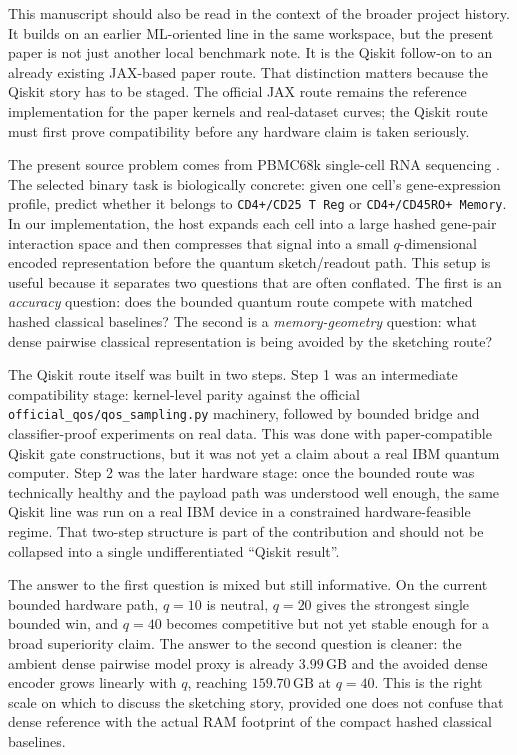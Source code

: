 \documentclass[11pt]{article}
\begin{document}
This manuscript should also be read in the context of the broader project history. It builds on an earlier ML-oriented line in the same workspace, but the present paper is not just another local benchmark note. It is the Qiskit follow-on to an already existing JAX-based paper route. That distinction matters because the Qiskit story has to be staged. The official JAX route remains the reference implementation for the paper kernels and real-dataset curves; the Qiskit route must first prove compatibility before any hardware claim is taken seriously.

The present source problem comes from PBMC68k single-cell RNA sequencing \cite{zheng2017massively,stuart2019singlecell}. The selected binary task is biologically concrete: given one cell's gene-expression profile, predict whether it belongs to \texttt{CD4+/CD25 T Reg} or \texttt{CD4+/CD45RO+ Memory}. In our implementation, the host expands each cell into a large hashed gene-pair interaction space and then compresses that signal into a small $q$-dimensional encoded representation before the quantum sketch/readout path. This setup is useful because it separates two questions that are often conflated. The first is an \emph{accuracy} question: does the bounded quantum route compete with matched hashed classical baselines? The second is a \emph{memory-geometry} question: what dense pairwise classical representation is being avoided by the sketching route?

The Qiskit route itself was built in two steps. Step 1 was an intermediate compatibility stage: kernel-level parity against the official \texttt{official\_qos/qos\_sampling.py} machinery, followed by bounded bridge and classifier-proof experiments on real data. This was done with paper-compatible Qiskit gate constructions, but it was not yet a claim about a real IBM quantum computer. Step 2 was the later hardware stage: once the bounded route was technically healthy and the payload path was understood well enough, the same Qiskit line was run on a real IBM device in a constrained hardware-feasible regime. That two-step structure is part of the contribution and should not be collapsed into a single undifferentiated ``Qiskit result''.

The answer to the first question is mixed but still informative. On the current bounded hardware path, $q=10$ is neutral, $q=20$ gives the strongest single bounded win, and $q=40$ becomes competitive but not yet stable enough for a broad superiority claim. The answer to the second question is cleaner: the ambient dense pairwise model proxy is already $3.99\,\mathrm{GB}$ and the avoided dense encoder grows linearly with $q$, reaching $159.70\,\mathrm{GB}$ at $q=40$. This is the right scale on which to discuss the sketching story, provided one does not confuse that dense reference with the actual RAM footprint of the compact hashed classical baselines.
\end{document}
